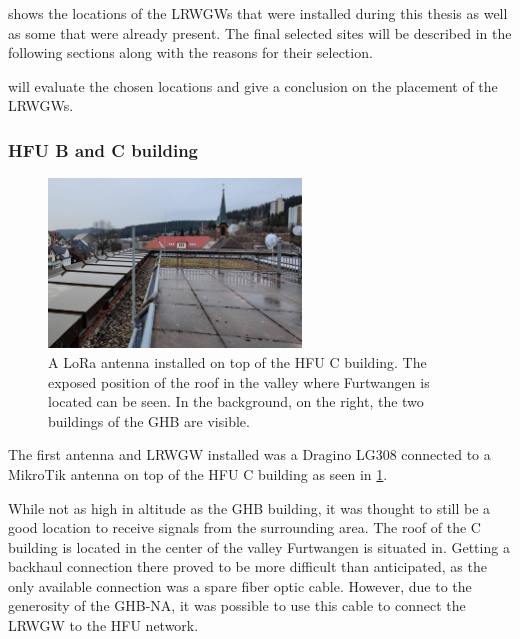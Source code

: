  shows the locations of the \aclp{LRWGW} that were installed during this thesis as well as some that were already present.
The final selected sites will be described in the following sections along with the reasons for their selection.

 will evaluate the chosen locations and give a conclusion on the placement of the \aclp{LRWGW}.

\subsubsection{\acl{HFU} B and C building}

\begin{figure}[htbp]
    \centering
    \includegraphics[width=0.6\textwidth]{pictures/hardware/gateway-deployment/mikrotik-antenna-c-building.jpg}
    \caption{
        A \ac{LoRa} antenna installed on top of the \ac{HFU} C building.
        The exposed position of the roof in the valley where Furtwangen is located can be seen.
        In the background, on the right, the two buildings of the \acf{GHB} are visible.
    }\label{pic:mikrotik-antenna-c-building}
\end{figure}

The first antenna and \acl{LRWGW} installed was a Dragino LG308 connected to a MikroTik antenna on top of the \ac{HFU} C building as seen in \cref{pic:mikrotik-antenna-c-building}.

While not as high in altitude as the \ac{GHB} building, it was thought to still be a good location to receive signals from the surrounding area.
The roof of the C building is located in the center of the valley Furtwangen is situated in.
Getting a backhaul connection there proved to be more difficult than anticipated, as the only available connection was a spare fiber optic cable.
However, due to the generosity of the \acl{GHB-NA}, it was possible to use this cable to connect the \acl{LRWGW} to the \ac{HFU} network.

